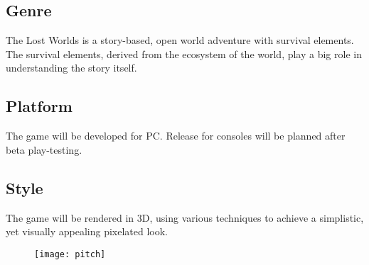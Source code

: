 \documentclass[a4paper,10pt,english]{article}
\begin{document}
\subsection*{Genre}
The Lost Worlds is a story-based, open world adventure with survival elements. The survival elements, derived from the ecosystem of the world, play a big role in understanding the story itself. 

\subsection*{Platform}
The game will be developed for PC. Release for consoles will be planned after beta play-testing.

\subsection*{Style}
The game will be rendered in 3D, using various techniques to achieve a simplistic, yet visually appealing pixelated look.

\vspace{1cm}
\begin{figure}[h]
\centering
\texttt{[image: pitch]}
\end{figure}
\end{document}
